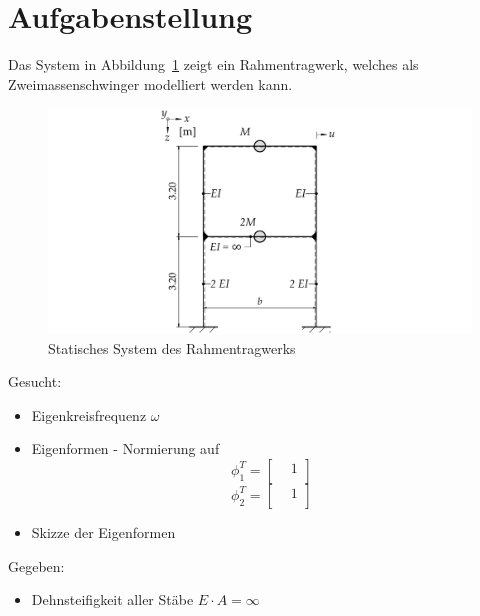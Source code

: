 \documentclass[
  letterpaper,
  DIV=11]{scrreprt}
\providecommand{\tightlist}{%
  \setlength{\itemsep}{0pt}\setlength{\parskip}{0pt}}\usepackage{longtable,booktabs,array}
\begin{document}
\hypertarget{aufgabenstellung-10}{%
\section{Aufgabenstellung}\label{aufgabenstellung-10}}

Das System in Abbildung~\ref{fig-mms_steif_system_mms2} zeigt ein
Rahmentragwerk, welches als Zweimassenschwinger modelliert werden kann.

\begin{figure}[H]

{\centering \includegraphics{index_files/mediabag/bilder/aufgabe_mms_steif_system.pdf}

}

\caption{\label{fig-mms_steif_system_mms2}Statisches System des
Rahmentragwerks}

\end{figure}

Gesucht:

\begin{itemize}
\item
  Eigenkreisfrequenz \(\omega\)
\item
  Eigenformen - Normierung auf \[\phi_1^T = 
  \begin{bmatrix}
   &  1\\
  \end{bmatrix} \] \[\phi_2^T =
  \begin{bmatrix}
   &  1\\
  \end{bmatrix}\]
\item
  Skizze der Eigenformen
\end{itemize}

Gegeben:

\begin{itemize}
\tightlist
\item
  Dehnsteifigkeit aller Stäbe \(E\cdot A = \infty\)
\end{itemize}
\end{document}
